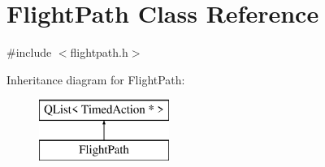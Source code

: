 \hypertarget{class_flight_path}{}\section{Flight\+Path Class Reference}
\label{class_flight_path}


{\ttfamily \#include $<$flightpath.\+h$>$}

Inheritance diagram for Flight\+Path\+:\begin{figure}[H]
\begin{center}
\leavevmode
\includegraphics[height=2.000000cm]{class_flight_path}
\end{center}
\end{figure}
